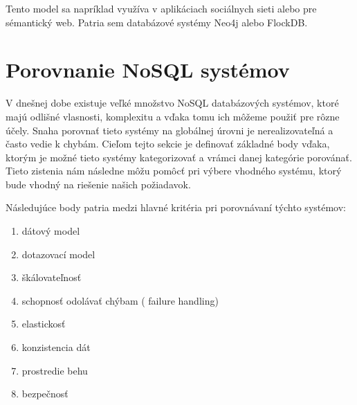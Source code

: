 \documentclass[11pt,twoside,a4paper]{book}
\begin{document}
Tento model sa napríklad využíva v aplikáciach sociálnych sieti alebo pre sémantický web. Patria sem databázové systémy Neo4j alebo FlockDB.


\section{Porovnanie NoSQL systémov}

V dnešnej dobe existuje veľké množstvo NoSQL databázových systémov, ktoré majú odlišné vlasnosti, komplexitu a vďaka tomu ich môžeme použiť pre rôzne účely. Snaha porovnať tieto systémy na globálnej úrovni je nerealizovateľná a často vedie k chybám. Cieľom tejto sekcie je definovať základné body vďaka, ktorým je možné tieto systémy kategorizovať a vrámci danej kategórie porovánať. Tieto zistenia nám následne môžu pomôcť pri výbere vhodného systému, ktorý bude vhodný na riešenie našich požiadavok.


Následujúce body patria medzi hlavné kritéria pri porovnávaní týchto systémov:
\begin{enumerate}
 \item
  dátový model
 \item 
  dotazovací model
 \item
  škálovateľnosť
 \item 
  schopnosť odolávať chýbam ( failure handling)
 \item
  elastickosť
 \item 
  konzistencia dát
 \item
  prostredie behu
 \item 
  bezpečnosť 
\end{enumerate}
\end{document}
